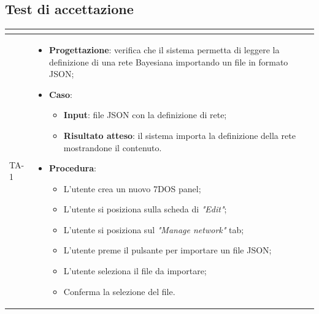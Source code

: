 \subsection{Test di accettazione}
\normalsize
\renewcommand{\arraystretch}{1}
\begin{longtable}{|C{2.5cm}|C{13cm}|}
	\hline
	\textbf{\color{title_text}{Test}} & \textbf{\color{title_text}{Specifica}}  \\
	\hline
	\endhead
{TA-1} &
\begin{itemize}
	\item \textbf{Progettazione}: verifica che il sistema permetta di leggere la definizione di una rete Bayesiana importando un file in formato JSON;
	\item \textbf{Caso}: 
		\begin{itemize}
			\item \textbf{Input}: file JSON con la definizione di rete;
			\item \textbf{Risultato atteso}: il sistema importa la definizione della rete mostrandone il contenuto.
		\end{itemize}
	\item \textbf{Procedura}:
		\begin{itemize}
			\item L'utente crea un nuovo 7DOS panel;
			\item L'utente si posiziona sulla scheda di \emph{"Edit"};
			\item L'utente si posiziona sul \emph{"Manage network"} tab;
			\item L'utente preme il pulsante per importare un file JSON;
			\item L'utente seleziona il file da importare;
			\item Conferma la selezione del file.
		\end{itemize} 
\end{itemize} \\
\hline


\end{longtable}
